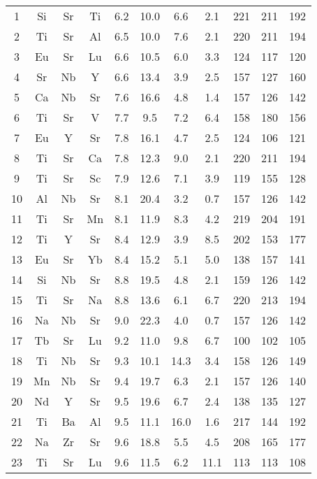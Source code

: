 \begin{center}
\begin{xtabular}{c|ccc|cccc|ccc}
  1 &  Si &  Sr &  Ti & 6.2 &  10.0 & 6.6 & 2.1 & 221 & 211 & 192 \\
  2 &  Ti &  Sr &  Al & 6.5 &  10.0 & 7.6 & 2.1 & 220 & 211 & 194 \\
  3 &  Eu &  Sr &  Lu & 6.6 &  10.5 & 6.0 & 3.3 & 124 & 117 & 120 \\
  4 &  Sr &  Nb &   Y & 6.6 &  13.4 & 3.9 & 2.5 & 157 & 127 & 160 \\
  5 &  Ca &  Nb &  Sr & 7.6 &  16.6 & 4.8 & 1.4 & 157 & 126 & 142 \\
  6 &  Ti &  Sr &   V & 7.7 & 9.5 & 7.2 & 6.4 & 158 & 180 & 156 \\
  7 &  Eu &   Y &  Sr & 7.8 &  16.1 & 4.7 & 2.5 & 124 & 106 & 121 \\
  8 &  Ti &  Sr &  Ca & 7.8 &  12.3 & 9.0 & 2.1 & 220 & 211 & 194 \\
  9 &  Ti &  Sr &  Sc & 7.9 &  12.6 & 7.1 & 3.9 & 119 & 155 & 128 \\
 10 &  Al &  Nb &  Sr & 8.1 &  20.4 & 3.2 & 0.7 & 157 & 126 & 142 \\
 11 &  Ti &  Sr &  Mn & 8.1 &  11.9 & 8.3 & 4.2 & 219 & 204 & 191 \\
 12 &  Ti &   Y &  Sr & 8.4 &  12.9 & 3.9 & 8.5 & 202 & 153 & 177 \\
 13 &  Eu &  Sr &  Yb & 8.4 &  15.2 & 5.1 & 5.0 & 138 & 157 & 141 \\
 14 &  Si &  Nb &  Sr & 8.8 &  19.5 & 4.8 & 2.1 & 159 & 126 & 142 \\
 15 &  Ti &  Sr &  Na & 8.8 &  13.6 & 6.1 & 6.7 & 220 & 213 & 194 \\
 16 &  Na &  Nb &  Sr & 9.0 &  22.3 & 4.0 & 0.7 & 157 & 126 & 142 \\
 17 &  Tb &  Sr &  Lu & 9.2 &  11.0 & 9.8 & 6.7 & 100 & 102 & 105 \\
 18 &  Ti &  Nb &  Sr & 9.3 &  10.1 &  14.3 & 3.4 & 158 & 126 & 149 \\
 19 &  Mn &  Nb &  Sr & 9.4 &  19.7 & 6.3 & 2.1 & 157 & 126 & 140 \\
 20 &  Nd &   Y &  Sr & 9.5 &  19.6 & 6.7 & 2.4 & 138 & 135 & 127 \\
 21 &  Ti &  Ba &  Al & 9.5 &  11.1 &  16.0 & 1.6 & 217 & 144 & 192 \\
 22 &  Na &  Zr &  Sr & 9.6 &  18.8 & 5.5 & 4.5 & 208 & 165 & 177 \\
 23 &  Ti &  Sr &  Lu & 9.6 &  11.5 & 6.2 &  11.1 & 113 & 113 & 108 \\

\end{xtabular}
\end{center}
